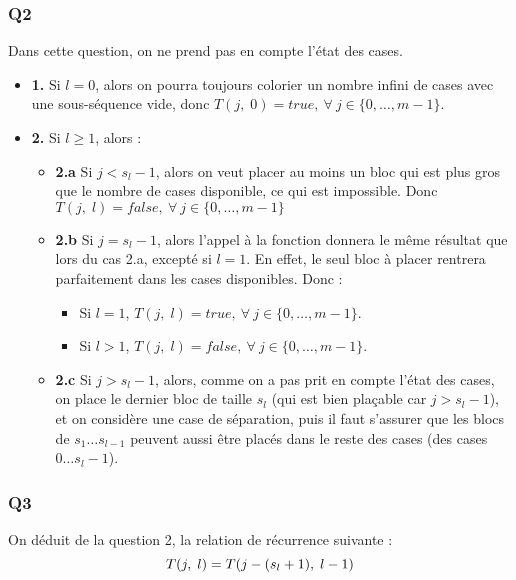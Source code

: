 \documentclass[a4paper]{memoir}
\begin{document}
	\subsubsection{Q2}
	Dans cette question, on ne prend pas en compte l'état des cases. 
	\begin{itemize}
	\item \textbf{1.} Si $l = 0$, alors on pourra toujours colorier un nombre infini de cases avec une sous-séquence vide, donc $T(j,\;0) = true,\ \forall\ j \in \{0, \ldots, m - 1\}$.
 	\item \textbf{2.} Si $l \geq 1$, alors :
 		\begin{itemize}
		\renewcommand{\labelitemii}{$\bullet$} %
			\item \textbf{2.a} Si $j < s_l - 1$, alors on veut placer au moins un bloc qui est plus gros que le nombre de cases disponible, ce qui est impossible. Donc $T(j,\; l) = false,\ \forall\ j \in \{0, \ldots, m - 1\}$  
 			\item \textbf{2.b} Si $j = s_l - 1$, alors l'appel à la fonction donnera le même résultat que lors du cas 2.a, excepté si $l = 1$. En effet, le seul bloc à placer rentrera parfaitement dans les cases disponibles. Donc :
 			\begin{itemize}
				\item Si $l = 1$, $T(j,\; l) = true,\ \forall\ j \in \{0, \ldots, m - 1\}$.
				\item Si $l > 1$, $T(j,\; l) = false,\ \forall\ j \in \{0, \ldots, m - 1\}$.
			\end{itemize}
			\item \textbf{2.c} Si $j > s_l - 1$, alors, comme on  a pas prit en compte l'état des cases, on place le dernier bloc de taille $s_l$ (qui est bien plaçable car $j > s_l - 1$), et on considère une case de séparation, puis il faut s'assurer que les blocs de $s_1 \ldots s_{l-1}$ peuvent aussi être placés dans le reste des cases (des cases $0 \ldots s_l - 1$).
		\end{itemize}
	\end{itemize}
	
	\subsubsection{Q3}
	On déduit de la question 2, la relation de récurrence suivante :
\begin{equation}
T(j,\; l) = T(j - (s_l + 1),\; l - 1)\notag
\end{equation}
\end{document}
